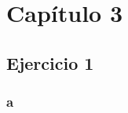 \documentclass[]{book}
\newenvironment{Shaded}{\begin{snugshade}}{\end{snugshade}}
\newcommand{\KeywordTok}[1]{\textcolor[rgb]{0.13,0.29,0.53}{\textbf{#1}}}
\newcommand{\NormalTok}[1]{#1}
\newcommand{\OperatorTok}[1]{\textcolor[rgb]{0.81,0.36,0.00}{\textbf{#1}}}
\newcommand{\StringTok}[1]{\textcolor[rgb]{0.31,0.60,0.02}{#1}}
\begin{document}
\hypertarget{capitulo-3}{%
\section{Capítulo 3}\label{capitulo-3}}

\hypertarget{ejercicio-1-5}{%
\subsection{Ejercicio 1}\label{ejercicio-1-5}}

\hypertarget{a}{%
\subsubsection{a}\label{a}}

\begin{Shaded}
\end{Shaded}
\end{document}
